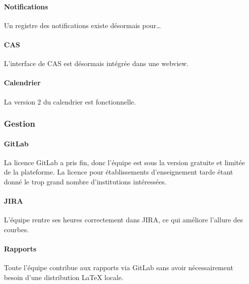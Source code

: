 \paragraph{Notifications} Un registre des notifications existe désormais pour\dots %

\paragraph{CAS} L'interface de CAS est désormais intégrée dans une webview.

\paragraph{Calendrier} La version 2 du calendrier est fonctionnelle.

\subsubsection{Gestion}

\paragraph{GitLab} La licence GitLab a pris fin, donc l'équipe est sous la version gratuite et limitée de la plateforme. La licence pour établissements d'enseignement tarde étant donné le trop grand nombre d'institutions intéressées.

\paragraph{JIRA} L'équipe rentre ses heures correctement dans JIRA, ce qui améliore l'allure des courbes.

\paragraph{Rapports} Toute l'équipe contribue aux rapports via GitLab sans avoir nécessairement besoin d'une distribution \LaTeX{} locale.


